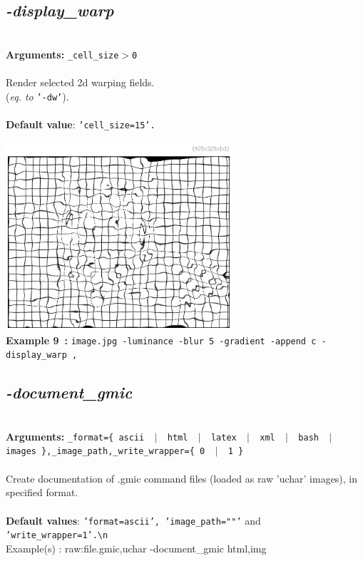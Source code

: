 \documentclass[a4paper,11pt,twoside]{book}
\begin{document}
\subsection{\emph{-display\_warp} }\vspace*{-0.5em}
~\\\textbf{Arguments: } 
{\small \texttt{\_cell\_size$>$0}}\\~\\
Render selected 2d warping fields.
~\\(\emph{eq. to} {\small \texttt{'-dw'}}).
~\\~\\\textbf{Default value}: {\small \texttt{'cell\_size=15'.}}
\begin{center}\includegraphics[keepaspectratio=true,height=7cm,width=\textwidth]{img/gmic_def9.jpg}\\
{\footnotesize \textbf{Example 9~:} \texttt{image.jpg -luminance -blur 5 -gradient -append c -display\_warp ,}}
\end{center}

\subsection{\emph{-document\_gmic} }\vspace*{-0.5em}
~\\\textbf{Arguments: } 
{\small \texttt{\_format=\{ ascii ~$|$~ html ~$|$~ latex ~$|$~ xml ~$|$~ bash ~$|$~ images \},\_image\_path,\_write\_wrapper=\{ 0 ~$|$~ 1 \}}}\\~\\
Create documentation of .gmic command files (loaded as raw 'uchar' images), in specified format.
~\\~\\\textbf{Default values}: {\small \texttt{'format=ascii', 'image\_path=""'} and \texttt{'write\_wrapper=1'.\textbackslash n}}
~\\Example(s) : raw:file.gmic,uchar -document\_gmic html,img
\end{document}
